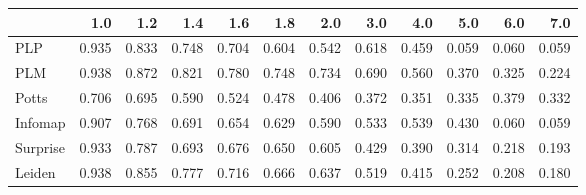 \begin{tabular}{lrrrrrrrrrrr}
\toprule
{} &   1.0 &   1.2 &   1.4 &   1.6 &   1.8 &   2.0 &   3.0 &   4.0 &   5.0 &   6.0 &   7.0 \\
\midrule
PLP      & 0.935 & 0.833 & 0.748 & 0.704 & 0.604 & 0.542 & 0.618 & 0.459 & 0.059 & 0.060 & 0.059 \\
PLM      & 0.938 & 0.872 & 0.821 & 0.780 & 0.748 & 0.734 & 0.690 & 0.560 & 0.370 & 0.325 & 0.224 \\
Potts    & 0.706 & 0.695 & 0.590 & 0.524 & 0.478 & 0.406 & 0.372 & 0.351 & 0.335 & 0.379 & 0.332 \\
Infomap  & 0.907 & 0.768 & 0.691 & 0.654 & 0.629 & 0.590 & 0.533 & 0.539 & 0.430 & 0.060 & 0.059 \\
Surprise & 0.933 & 0.787 & 0.693 & 0.676 & 0.650 & 0.605 & 0.429 & 0.390 & 0.314 & 0.218 & 0.193 \\
Leiden   & 0.938 & 0.855 & 0.777 & 0.716 & 0.666 & 0.637 & 0.519 & 0.415 & 0.252 & 0.208 & 0.180 \\
\bottomrule
\end{tabular}

